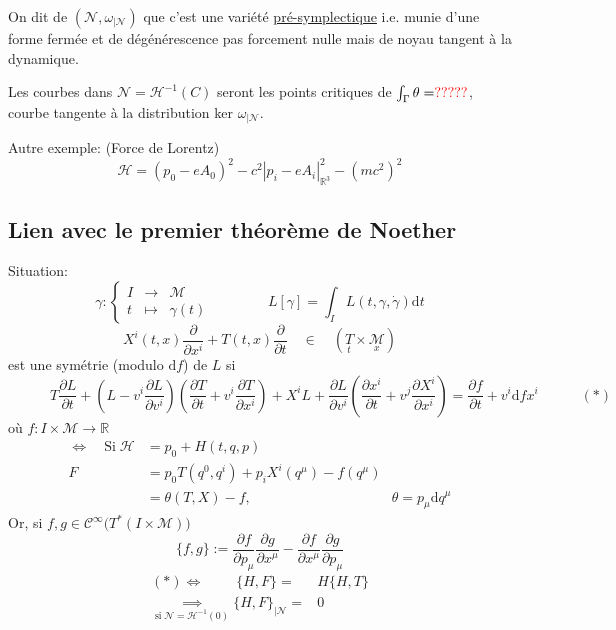 \documentclass[a4paper,11pt]{article}
\renewcommand{\d}{{\mathrm{d}}}
\newcommand{\dr}[2]{\frac{\partial {#1}}{\partial{#2}}}
\begin{document}
On dit de $\left(\mathcal{N},\omega_{|\mathcal{N}}\right)$ que c'est une variété \underline{pré-symplectique} i.e. munie d'une forme fermée et de dégénérescence pas forcement nulle mais de noyau tangent à la dynamique.

Les courbes dans $\mathcal{N}= \mathcal{H}^{-1}(C)$ seront les points critiques de $\int_\Gamma \theta = \color{red} ?????\color{black}$, courbe tangente à la distribution ker $\omega_{|\mathcal{N}}$.

\noindent Autre exemple: (Force de Lorentz)
$$\mathcal{H} = (p_0 - eA_0)^2 - c^2|p_i-eA_i|^2_{\mathbb{R}^3} - (mc^2)^2$$

\subsection{Lien avec le premier théorème de Noether}
Situation:
$$\gamma : \left\{ \begin{matrix}
I & \to & \mathcal{M}\\
t & \mapsto & \gamma(t)
\end{matrix}\right.
\quad \quad \quad \quad
L[\gamma]=\int_I L(t,\gamma,\dot\gamma)\d t$$
$$X^i(t,x)\dr{}{x^i} + T(t,x)\dr{}t \quad \in \quad (\underset t T \times \underset x {\mathcal{M}})$$
est une symétrie (modulo $\d f$) de $L$ si 
$$\quad \quad \quad T\dr L t + \left(L - v^i \dr L {v^i}\right)\left(\dr T t + v^i \dr T {x^i}\right) + X^iL + \dr L{v^i} \left(\dr {x^i} t + v^j \dr{X^i}{x^i}\right)
= \dr f t + v^i \d f {x^i} \quad \quad \quad (*)$$
où $f: I\times\mathcal{M}\to \mathbb{R}$
\begin{align*}
\iff \quad \mathrm{Si}\; \mathcal{H} &= p_0 + H(t,q,p)\\
F &= p_0 T(q^0,q^i) + p_i X^i(q^\mu) - f(q^\mu)\\
&= \theta(T,X) - f, \quad\quad\quad\quad\quad\quad\quad\quad\quad\quad \theta=p_\mu\d q^\mu
\end{align*}
Or, si $f,g\in \mathcal{C}^\infty\big(T^*(I\times\mathcal{M})\big)$
$$\{f,g\} := \dr f{p_\mu}\dr g{x^\mu} - \dr f{x^\mu}\dr g{p_\mu}$$
\begin{align*}
(*) \iff \quad \quad \;\{H,F\} =& H\{H,T\}\\
\underset {\mathrm{si}\; \mathcal{N}=\mathcal{H}^{-1}(0)} \implies \{H,F\}_{|\mathcal{N}} =& 0
\end{align*}
\end{document}
